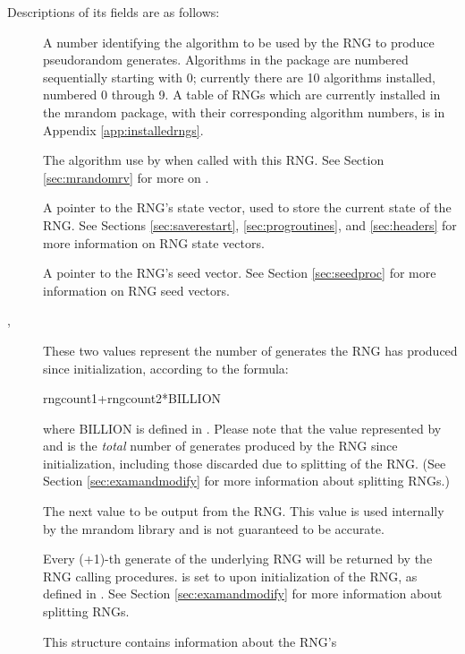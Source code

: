 Descriptions of its fields are as follows:

\begin{description}
\item[] A number identifying the algorithm to be used by
the RNG to produce pseudorandom generates.  Algorithms in the package
are numbered sequentially starting with 0; currently there are 10
algorithms installed, numbered 0 through 9.  A table of RNGs which are
currently installed in the mrandom package, with their corresponding
algorithm numbers, is in Appendix \ref{app:installedrngs}.
\item[] The algorithm use by  when
called with this RNG.  See Section \ref{sec:mrandomrv} for more on
.
\item[] A pointer to the RNG's state vector, used to
store the current state of the RNG.  See Sections \ref{sec:saverestart},
\ref{sec:progroutines}, and \ref{sec:headers} for more information on RNG
state vectors.
\item[] A pointer to the RNG's seed vector.  See Section
\ref{sec:seedproc} for more information on RNG seed vectors.
\item[, ] These two values represent the
number of generates the RNG has produced since initialization, according
to the formula:\\
\begin{example}
rngcount1+rngcount2*BILLION\\
\end{example}
where BILLION is defined in .  Please note that the
value represented by  and  is the {\it
total} number of generates produced by the RNG since initialization,
including those discarded due to splitting of the RNG.  (See Section
\ref{sec:examandmodify} for more information about splitting RNGs.)
\item[] The next value to be output from the RNG.  This
value is used internally by the mrandom library and is not guaranteed to
be accurate.
\item[] Every (+1)-th generate of the
underlying RNG will be returned by the RNG calling procedures.
 is set to  upon initialization of the
RNG, as defined in .  See Section \ref{sec:examandmodify}
for more information about splitting RNGs.
\item[] This structure contains information about the RNG's

\end{description}
